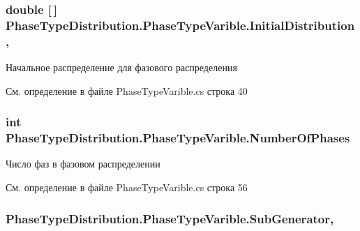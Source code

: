 \subsubsection[{\texorpdfstring{Initial\+Distribution}{InitialDistribution}}]{\setlength{\rightskip}{0pt plus 5cm}double \mbox{[}$\,$\mbox{]} Phase\+Type\+Distribution.\+Phase\+Type\+Varible.\+Initial\+Distribution\hspace{0.3cm}{\ttfamily [get]}, {}}\hypertarget{class_phase_type_distribution_1_1_phase_type_varible_ac9102d397b010f61b97cda69acfdb31b}{}\label{class_phase_type_distribution_1_1_phase_type_varible_ac9102d397b010f61b97cda69acfdb31b}


Начальное распределение для фазового распределения 



См. определение в файле Phase\+Type\+Varible.\+cs строка 40

\subsubsection[{\texorpdfstring{Number\+Of\+Phases}{NumberOfPhases}}]{\setlength{\rightskip}{0pt plus 5cm}int Phase\+Type\+Distribution.\+Phase\+Type\+Varible.\+Number\+Of\+Phases\hspace{0.3cm}{\ttfamily [get]}}\hypertarget{class_phase_type_distribution_1_1_phase_type_varible_a1bfaf7709c227b28fbbc89b808a89bfe}{}\label{class_phase_type_distribution_1_1_phase_type_varible_a1bfaf7709c227b28fbbc89b808a89bfe}


Число фаз в фазовом распределении 



См. определение в файле Phase\+Type\+Varible.\+cs строка 56

\subsubsection[{\texorpdfstring{Sub\+Generator}{SubGenerator}}]{ Phase\+Type\+Distribution.\+Phase\+Type\+Varible.\+Sub\+Generator\hspace{0.3cm}{\ttfamily [get]}, {}}\hypertarget{class_phase_type_distribution_1_1_phase_type_varible_a9832e75be88711d5939e808aea3b4121}{}\label{class_phase_type_distribution_1_1_phase_type_varible_a9832e75be88711d5939e808aea3b4121}


